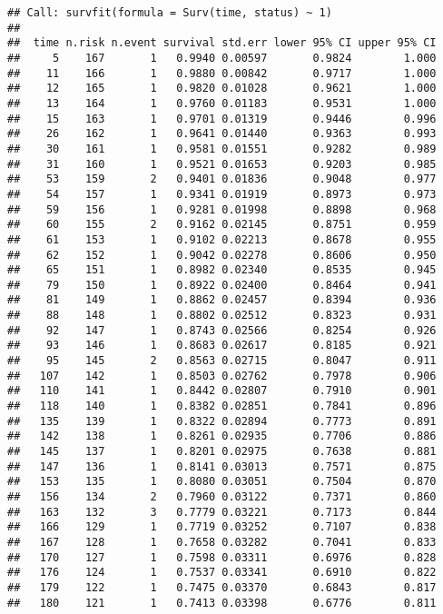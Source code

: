 \documentclass[]{book}
\theoremstyle{definition}
\theoremstyle{definition}
\theoremstyle{definition}
\theoremstyle{remark}
\begin{document}
\begin{verbatim}
## Call: survfit(formula = Surv(time, status) ~ 1)
## 
##  time n.risk n.event survival std.err lower 95% CI upper 95% CI
##     5    167       1   0.9940 0.00597       0.9824        1.000
##    11    166       1   0.9880 0.00842       0.9717        1.000
##    12    165       1   0.9820 0.01028       0.9621        1.000
##    13    164       1   0.9760 0.01183       0.9531        1.000
##    15    163       1   0.9701 0.01319       0.9446        0.996
##    26    162       1   0.9641 0.01440       0.9363        0.993
##    30    161       1   0.9581 0.01551       0.9282        0.989
##    31    160       1   0.9521 0.01653       0.9203        0.985
##    53    159       2   0.9401 0.01836       0.9048        0.977
##    54    157       1   0.9341 0.01919       0.8973        0.973
##    59    156       1   0.9281 0.01998       0.8898        0.968
##    60    155       2   0.9162 0.02145       0.8751        0.959
##    61    153       1   0.9102 0.02213       0.8678        0.955
##    62    152       1   0.9042 0.02278       0.8606        0.950
##    65    151       1   0.8982 0.02340       0.8535        0.945
##    79    150       1   0.8922 0.02400       0.8464        0.941
##    81    149       1   0.8862 0.02457       0.8394        0.936
##    88    148       1   0.8802 0.02512       0.8323        0.931
##    92    147       1   0.8743 0.02566       0.8254        0.926
##    93    146       1   0.8683 0.02617       0.8185        0.921
##    95    145       2   0.8563 0.02715       0.8047        0.911
##   107    142       1   0.8503 0.02762       0.7978        0.906
##   110    141       1   0.8442 0.02807       0.7910        0.901
##   118    140       1   0.8382 0.02851       0.7841        0.896
##   135    139       1   0.8322 0.02894       0.7773        0.891
##   142    138       1   0.8261 0.02935       0.7706        0.886
##   145    137       1   0.8201 0.02975       0.7638        0.881
##   147    136       1   0.8141 0.03013       0.7571        0.875
##   153    135       1   0.8080 0.03051       0.7504        0.870
##   156    134       2   0.7960 0.03122       0.7371        0.860
##   163    132       3   0.7779 0.03221       0.7173        0.844
##   166    129       1   0.7719 0.03252       0.7107        0.838
##   167    128       1   0.7658 0.03282       0.7041        0.833
##   170    127       1   0.7598 0.03311       0.6976        0.828
##   176    124       1   0.7537 0.03341       0.6910        0.822
##   179    122       1   0.7475 0.03370       0.6843        0.817
##   180    121       1   0.7413 0.03398       0.6776        0.811

\end{verbatim}
\end{document}
